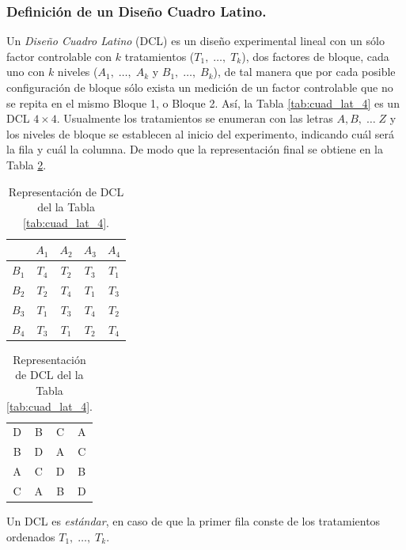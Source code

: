 \documentclass[11pt,a4paper]{article}
\begin{document}
\subsubsection{Definición de un Diseño Cuadro Latino.} %
\label{subs:definicion_dcl}
Un \textit{Diseño Cuadro Latino} (DCL) es un diseño experimental lineal con un sólo factor controlable con \(k\) tratamientos (\(T_1, \;\ldots,\; T_k\)), dos factores de bloque, cada uno con \(k\) niveles (\(A_1 , \;\ldots,\; A_k\) y \(B_1, \;\ldots,\; B_k\)), de tal manera que por cada posible configuración de bloque sólo exista un medición de un factor controlable que no se repita en el mismo Bloque 1, o Bloque 2.
Así, la Tabla \ref{tab:cuad_lat_4} es un DCL \(4 \times 4\).
Usualmente los tratamientos se enumeran con las letras \(A,B, \;\ldots\;Z\) y los niveles de bloque se establecen al inicio del experimento, indicando cuál será la fila y cuál la columna.
De modo que la representación final se obtiene en la Tabla \ref{tab:representacion}.
\newpage
\begin{table}[ht!]
	\begin{minipage}{0.5\linewidth}
	\centering
	\begin{tabular}{c|*{4}{c}}
					& \(A_1\) &	\(A_2\) &	\(A_3\) & \(A_4\) \\ \hline
		\(B_1\) & \(T_4\) & \(T_2\) & \(T_3\) & \(T_1\) \\
		\(B_2\) & \(T_2\) & \(T_4\) & \(T_1\) & \(T_3\) \\
		\(B_3\) & \(T_1\) & \(T_3\) & \(T_4\) & \(T_2\) \\
		\(B_4\) & \(T_3\) & \(T_1\) & \(T_2\) & \(T_4\) \\
	\end{tabular}
	\caption{Ejemplo de DCL no--estándar.}
	\label{tab:cuad_lat_4}
	\end{minipage}\hspace{5mm}
	\begin{minipage}{0.5\linewidth}
		\centering
		\begin{tabular}{*{4}{c}}
		D & B & C & A \\
		B & D & A & C \\
		A & C & D & B \\
		C & A & B & D
	\end{tabular}
	\caption{Representación de DCL del la Tabla \ref{tab:cuad_lat_4}.} 
	\label{tab:representacion}
	\end{minipage}
\end{table}
Un DCL es \textit{estándar}, en caso de que  la primer fila conste de los tratamientos ordenados \(T_1, \;\ldots,\; T_k\).
\end{document}
